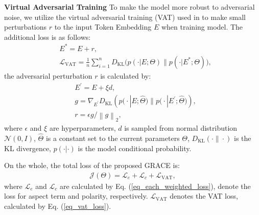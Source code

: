 \documentclass[11pt,a4paper]{article}
\begin{document}
\noindent
\textbf{Virtual Adversarial Training}\quad 
To make the model more robust to adversarial noise, we utilize the virtual adversarial training (VAT) used in \cite{Miyato2016} to make small perturbations $r$ to the input Token Embedding $E$ when training model. The additional loss is as follows:
\begin{align}
    &E^* = E + r, \\
	&\mathcal{L}_{\mathrm{VAT}} \! =\! \frac{1}{n}\!\! \sum_{i=1}^{n}\!\! D_{\mathrm{KL}}\big(p(\cdot | E ; \! \Theta) \| p\left(\cdot | E^* ; \! \Theta\right)\big), \label{eq_vat_loss}
\end{align}
the adversarial perturbation $r$ is calculated by:
\begin{align}
    &E^{\prime}=E + \xi d, \label{eq_xi} \\
    &g=\nabla_{E^{\prime}} D_{\mathrm{KL}}\left(p\big(\cdot | E ; \hat{\Theta}\big) \| p\big(\cdot | E^{\prime} ; \hat{\Theta}\big)\right), \\
    &r=\epsilon g /\left\|g\right\|_{2}, \label{eq_epsilon}
\end{align}
where $\epsilon$ and $\xi$ are hyperparameters, $d$ is sampled from normal distribution $\mathcal{N}(0, I)$, $\hat{\Theta}$ is a constant set to the current parameters $\Theta$, $D_{\mathrm{KL}}(\cdot \| \cdot)$ is the KL divergence, $p(\cdot|\cdot)$ is the model conditional probability.

On the whole, the total loss of the proposed GRACE is:
\begin{align}
    \mathcal{J}(\Theta) = \mathcal{L}_e + \mathcal{L}_c + \mathcal{L}_{\mathrm{VAT}},
\end{align}
where $\mathcal{L}_e$ and $\mathcal{L}_c$ are calculated by Eq. (\ref{eq_each_weighted_loss}), denote the loss for aspect term and polarity, respectively. $\mathcal{L}_{\mathrm{VAT}}$ denotes the VAT loss, calculated by Eq. (\ref{eq_vat_loss}).
\end{document}
